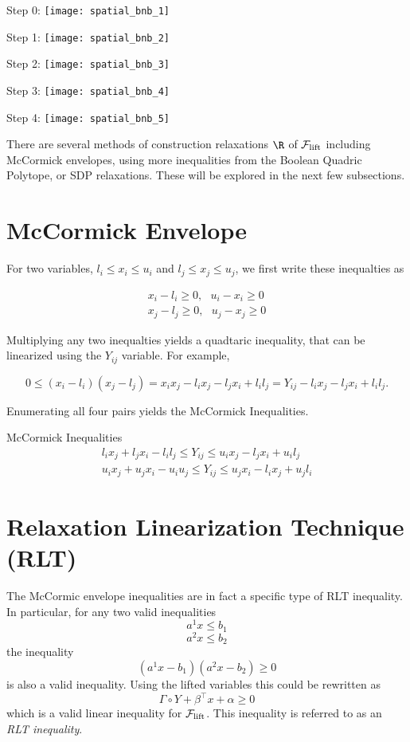 \begin{center}
Step 0:
\texttt{[image: spatial\_bnb\_1]}

Step 1:
\texttt{[image: spatial\_bnb\_2]}

Step 2:
\texttt{[image: spatial\_bnb\_3]}

Step 3:
\texttt{[image: spatial\_bnb\_4]}

Step 4:
\texttt{[image: spatial\_bnb\_5]}

\end{center}


There are several methods of construction relaxations $\R$ of ${\mathcal F}_{\mathrm{lift}}$ including McCormick envelopes, using more inequalities from the Boolean Quadric Polytope, or SDP relaxations.   These will be explored in the next few subsections.


\section{McCormick Envelope}
For two variables, $l_i \leq x_i \leq u_i$ and $l_j \leq x_j \leq u_j$, we first write these inequalties as 

\begin{align}
x_i - l_i \geq 0, \ \ \ u_i - x_i \geq 0\\
x_j - l_j \geq 0, \ \ \ u_j - x_j \geq 0
\end{align}

Multiplying any two inequalties yields a quadtaric inequality, that can be linearized using the $Y_{ij}$ variable.  For example, 

\begin{equation}
0 \leq (x_i - l_i) (x_j - l_j) = x_i x_j - l_i x_j - l_j x_i + l_i l_j = Y_{ij} - l_i x_j - l_j x_i + l_il_j.
\end{equation}

Enumerating all four pairs yields the McCormick Inequalities.

\begin{general}{McCormick Inequalities}{}
\begin{align}
 l_i x_j + l_j x_i - l_il_j \leq Y_{ij} \leq u_i x_j - l_j x_i + u_il_j\\
u_i x_j + u_j x_i - u_iu_j \leq Y_{ij} \leq  u_j x_i - l_i x_j + u_jl_i
\end{align}
\end{general}



\section{Relaxation Linearization Technique (RLT)}
The McCormic envelope inequalities are in fact a specific type of RLT inequality.  In particular, for any two valid inequalities
$$
a^1x \leq b_1
$$
$$
a^2x \leq b_2
$$
the inequality
$$
(a^1x - b_1)(a^2x - b_2) \geq 0
$$
is also a valid inequality.     
Using the lifted variables this could be rewritten as 
$$
\Gamma \circ Y + \beta^\top x + \alpha \geq 0
$$
which is a valid linear inequality for ${\mathcal F}_{\mathrm{lift}}$.  This inequality is referred to as an \emph{RLT inequality}.


